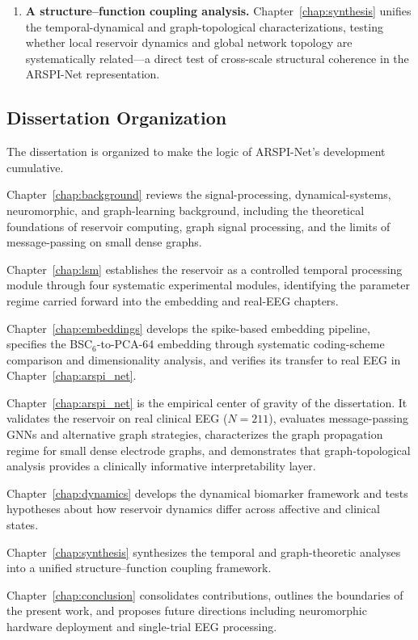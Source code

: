 \begin{enumerate}
    \item \textbf{A structure--function coupling analysis.} Chapter~\ref{chap:synthesis} unifies the temporal-dynamical and graph-topological characterizations, testing whether local reservoir dynamics and global network topology are systematically related---a direct test of cross-scale structural coherence in the ARSPI-Net representation.
\end{enumerate}

\subsection{Dissertation Organization}

The dissertation is organized to make the logic of ARSPI-Net's development cumulative.

Chapter~\ref{chap:background} reviews the signal-processing, dynamical-systems, neuromorphic, and graph-learning background, including the theoretical foundations of reservoir computing, graph signal processing, and the limits of message-passing on small dense graphs.

Chapter~\ref{chap:lsm} establishes the reservoir as a controlled temporal processing module through four systematic experimental modules, identifying the parameter regime carried forward into the embedding and real-EEG chapters.

Chapter~\ref{chap:embeddings} develops the spike-based embedding pipeline, specifies the BSC$_6$-to-PCA-64 embedding through systematic coding-scheme comparison and dimensionality analysis, and verifies its transfer to real EEG in Chapter~\ref{chap:arspi_net}.

Chapter~\ref{chap:arspi_net} is the empirical center of gravity of the dissertation. It validates the reservoir on real clinical EEG ($N = 211$), evaluates message-passing GNNs and alternative graph strategies, characterizes the graph propagation regime for small dense electrode graphs, and demonstrates that graph-topological analysis provides a clinically informative interpretability layer.

Chapter~\ref{chap:dynamics} develops the dynamical biomarker framework and tests hypotheses about how reservoir dynamics differ across affective and clinical states.

Chapter~\ref{chap:synthesis} synthesizes the temporal and graph-theoretic analyses into a unified structure--function coupling framework.

Chapter~\ref{chap:conclusion} consolidates contributions, outlines the boundaries of the present work, and proposes future directions including neuromorphic hardware deployment and single-trial EEG processing.

